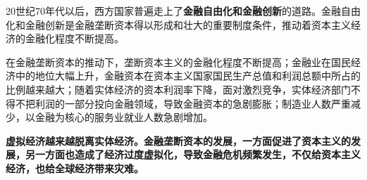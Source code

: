 20世纪70年代以后，西方国家普遍走上了\textbf{{{金融自由化和金融创新}}}的道路。{金融自由化和金融创新是金融垄断资本得以形成和壮大的重要制度条件}，推动着资本主义经济的金融化程度不断提高。

在金融垄断资本的推动下，垄断资本主义的金融化程度不断提高；金融业在国民经济中的地位大幅上升，金融资本在资本主义国家国民生产总值和利润总额中所占的比例越来越大；随着实体经济的资本利润率下降，面对激烈竞争，实体经济部门不得不把利润的一部分投向金融领域，导致金融资本的急剧膨胀；制造业人数严重减少，以金融为核心的服务业就业人数急剧增加。

\textbf{{虚拟经济越来越脱离实体经济。金融垄断资本的发展，一方面促进了资本主义的发展，另一方面也造成了经济过度虚拟化，导致金融危机频繁发生，不仅给资本主义经济，也给全球经济带来灾难。}}
